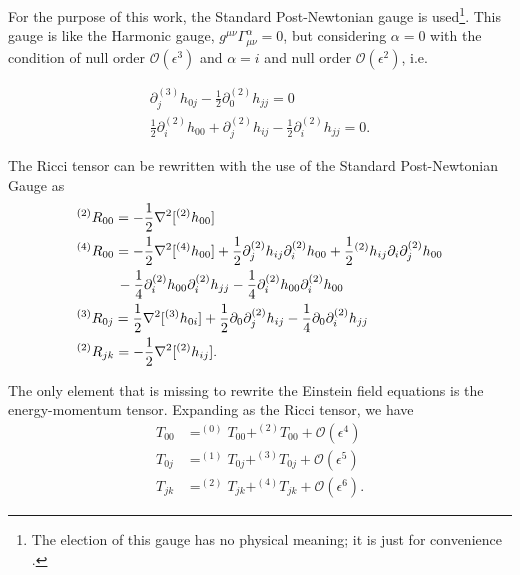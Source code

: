 For the purpose of this work, the Standard Post-Newtonian gauge is used\footnote{The election of this gauge has no physical meaning; it is just for convenience \cite{Theoryandexperiments}.}. This gauge is like the Harmonic gauge, $g^{\mu\nu}\Gamma_{\mu\nu}^{\alpha} = 0$, but considering  $\alpha = 0$ with the condition of null order $\mathcal{O}(\epsilon^3)$ and $\alpha = i$ and null order $\mathcal{O}(\epsilon^2)$, i.e.

\begin{subequations}
\begin{align}
\label{eq: standardgauge}
		\partial_j^{(3)}h_{0j}-\frac{1}{2}\partial_0^{(2)}h_{jj} = 0\\
		\frac{1}{2}\partial_i^{(2)}h_{00}+\partial_j^{(2)}h_{ij}-\frac{1}{2}\partial_i^{(2)}h_{jj} = 0.
\end{align}
\end{subequations}

The Ricci tensor can be rewritten with the use of the Standard Post-Newtonian Gauge as
\begin{subequations}
\begin{align}
\label{eq: riccitensorstandard}
&^{(2)}R_{00}=-\frac{1}{2}\nabla^2[^{(2)}h_{00}]\\
&^{(4)}R_{00} = -\frac{1}{2}\nabla^2[^{(4)}h_{00}] + \frac{1}{2}\partial_j^{(2)}h_{ij}\partial_i ^{(2)}h_{00} +\frac{1}{2}{}^{(2)}h_{ij}\partial_i\partial_j^{(2)}h_{00}\\ \notag
&\hspace{1cm}-\frac{1}{4}\partial_i^{(2)}h_{00}\partial_i^{(2)}h_{jj}-\frac{1}{4}\partial_i^{(2)}h_{00}\partial_i^{(2)}h_{00}\\
&^{(3)}R_{0j} = \frac{1}{2}\nabla^2[^{(3)}h_{0i}]+\frac{1}{2}\partial_0\partial_j^{(2)}h_{ij} -\frac{1}{4}\partial_0\partial_i^{(2)}h_{jj}\\
&^{(2)}R_{jk} =-\frac{1}{2}\nabla^2[^{(2)}h_{ij}].
\end{align}
\end{subequations}

The only element that is missing to rewrite the Einstein field equations is the energy-momentum tensor. Expanding as the Ricci tensor, we have
\begin{subequations}
	\begin{align}
T_{00} &= ^{(0)}T_{00}+^{(2)}T_{00}+\mathcal{O}(\epsilon^4)\\
T_{0j} &= ^{(1)}T_{0j}+^{(3)}T_{0j}+\mathcal{O}(\epsilon^5)\\
T_{jk} &= ^{(2)}T_{jk}+^{(4)}T_{jk}+\mathcal{O}(\epsilon^6).
\end{align}
\end{subequations}

